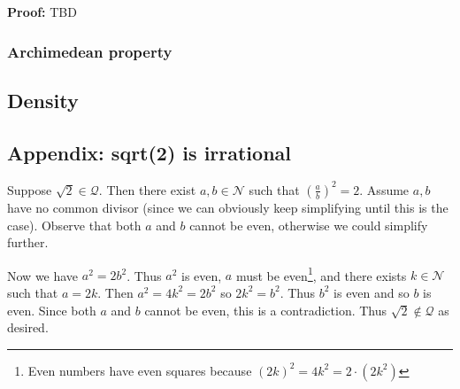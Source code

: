 \textbf{Proof:} TBD

\subsubsection*{Archimedean property}

\subsection{Density}

\subsection{Appendix: sqrt(2) is irrational}\label{sqrt2proof}
Suppose $\sqrt{2}\in\mathcal{Q}$. Then there exist $a,b\in\mathcal{N}$ such that
$\left(\frac{a}{b}\right)^{2}=2$. Assume $a, b$ have no common divisor
(since we can obviously keep simplifying until this is the case).
Observe that both $a$ and $b$ cannot be even, otherwise we could
simplify further.

\vs

Now we have $a^{2}=2b^{2}$. Thus $a^{2}$ is even, $a$ must be
even\footnote{Even numbers have even squares because
  ${(2k)}^{2}=4k^{2}=2\cdot(2k^{2})$}, and there exists
$k\in\mathcal{N}$ such that $a=2k$. Then $a^{2}=4k^{2}=2b^{2}$ so
$2k^{2}=b^{2}$. Thus $b^{2}$ is even and so $b$ is even. Since both
$a$ and $b$ cannot be even, this is a contradiction. Thus
$\sqrt{2}\notin\mathcal{Q}$ as desired.



